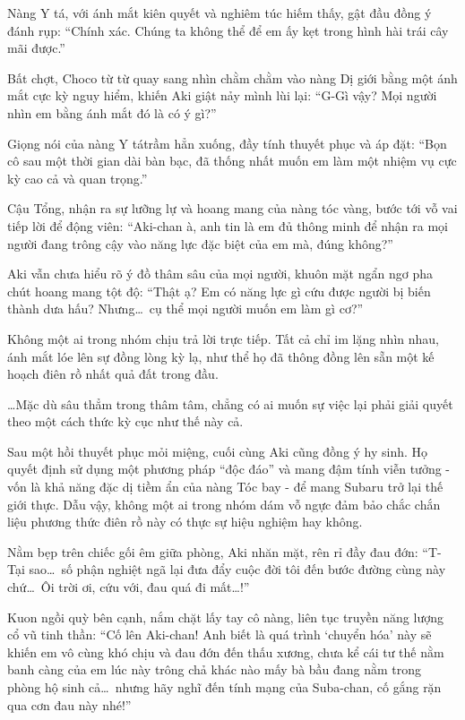\documentclass[../main.tex]{subfiles}
\begin{document}
Nàng Y tá, với ánh mắt kiên quyết và nghiêm túc hiếm thấy, gật đầu đồng ý đánh rụp:
``Chính xác. Chúng ta không thể để em ấy kẹt trong hình hài trái cây mãi được.''

Bất chợt, Choco từ từ quay sang nhìn chằm chằm vào nàng Dị giới bằng một ánh mắt cực kỳ nguy hiểm, khiến Aki giật nảy mình lùi lại:
``G-Gì vậy? Mọi người nhìn em bằng ánh mắt đó là có ý gì?''

Giọng nói của nàng Y tátrầm hẳn xuống, đầy tính thuyết phục và áp đặt:
``Bọn cô sau một thời gian dài bàn bạc, đã thống nhất muốn em làm một nhiệm vụ cực kỳ cao cả và quan trọng.''

Cậu Tổng, nhận ra sự lưỡng lự và hoang mang của nàng tóc vàng, bước tới vỗ vai tiếp lời để động viên:
``Aki-chan à, anh tin là em đủ thông minh để nhận ra mọi người đang trông cậy vào năng lực đặc biệt của em mà, đúng không?''

Aki vẫn chưa hiểu rõ ý đồ thâm sâu của mọi người, khuôn mặt ngẩn ngơ pha chút hoang mang tột độ:
``Thật ạ? Em có năng lực gì cứu được người bị biến thành dưa hấu? Nhưng\dots\ cụ thể mọi người muốn em làm gì cơ?''

Không một ai trong nhóm chịu trả lời trực tiếp. Tất cả chỉ im lặng nhìn nhau, ánh mắt lóe lên sự đồng lòng kỳ lạ, như thể họ đã thông đồng lên sẵn một kế hoạch điên rồ nhất quả đất trong đầu.

\dots Mặc dù sâu thẳm trong thâm tâm, chẳng có ai muốn sự việc lại phải giải quyết theo một cách thức kỳ cục như thế này cả.

\ct

Sau một hồi thuyết phục mỏi miệng, cuối cùng Aki cũng đồng ý hy sinh. Họ quyết định sử dụng một phương pháp ``độc đáo'' và mang đậm tính viễn tưởng - vốn là khả năng đặc dị tiềm ẩn của nàng Tóc bay - để mang Subaru trở lại thế giới thực. Dẫu vậy, không một ai trong nhóm dám vỗ ngực đảm bảo chắc chắn liệu phương thức điên rồ này có thực sự hiệu nghiệm hay không.

Nằm bẹp trên chiếc gối êm giữa phòng, Aki nhăn mặt, rên rỉ đầy đau đớn:
``T-Tại sao\dots\ số phận nghiệt ngã lại đưa đẩy cuộc đời tôi đến bước đường cùng này chứ\dots\ Ôi trời ơi, cứu với, đau quá đi mất\dots!''

Kuon ngồi quỳ bên cạnh, nắm chặt lấy tay cô nàng, liên tục truyền năng lượng cổ vũ tinh thần:
``Cố lên Aki-chan! Anh biết là quá trình `chuyển hóa' này sẽ khiến em vô cùng khó chịu và đau đớn đến thấu xương, chưa kể cái tư thế nằm banh càng của em lúc này trông chả khác nào mấy bà bầu đang nằm trong phòng hộ sinh cả\dots\ nhưng hãy nghĩ đến tính mạng của Suba-chan, cố gắng rặn qua cơn đau này nhé!''
\end{document}
